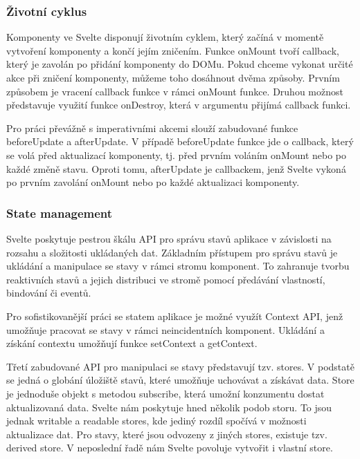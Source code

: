 \subsubsection{Životní cyklus}

Komponenty ve Svelte disponují životním cyklem, který začíná v momentě vytvoření komponenty a končí jejím zničením. 
Funkce onMount tvoří callback, který je zavolán po přidání komponenty do DOMu. Pokud chceme vykonat určité akce při zničení komponenty, můžeme toho dosáhnout dvěma způsoby. 
Prvním způsobem je vracení callback funkce v rámci onMount funkce. Druhou možnost představuje využití funkce onDestroy, která v argumentu přijímá callback funkci. 

Pro práci převážně s imperativními akcemi slouží zabudované funkce beforeUpdate a afterUpdate. 
V případě beforeUpdate funkce jde o callback, který se volá před aktualizací komponenty, tj. před prvním voláním onMount nebo po každé změně stavu. 
Oproti tomu, afterUpdate je callbackem, jenž Svelte vykoná po prvním zavolání onMount nebo po každé aktualizaci komponenty.\cite{sveltehandbook,svelte}

\subsubsection{State management}

Svelte poskytuje pestrou škálu API pro správu stavů aplikace v závislosti na rozsahu a složitosti ukládaných dat. 
Základním přístupem pro správu stavů je ukládání a manipulace se stavy v rámci stromu komponent. 
To zahranuje tvorbu reaktivních stavů a jejich distribuci ve stromě pomocí předávání vlastností, bindování či eventů. 

Pro sofistikovanější práci se statem aplikace je možné využít Context API, jenž umožňuje pracovat se stavy v rámci neincidentních komponent. 
Ukládání a získání contextu umožňují funkce setContext a getContext.

Třetí zabudované API pro manipulaci se stavy představují tzv. stores. V podstatě se jedná o globání úložiště stavů, které umožňuje uchovávat a získávat data. 
Store je jednoduše objekt s metodou subscribe, která umožní konzumentu dostat aktualizovaná data. Svelte nám poskytuje hned několik podob storu. 
To jsou jednak writable a readable stores, kde jediný rozdíl spočívá v možnosti aktualizace dat. Pro stavy, které jsou odvozeny z jiných stores, existuje tzv. derived store. 
V neposlední řadě nám Svelte povoluje vytvořit i vlastní store. 


